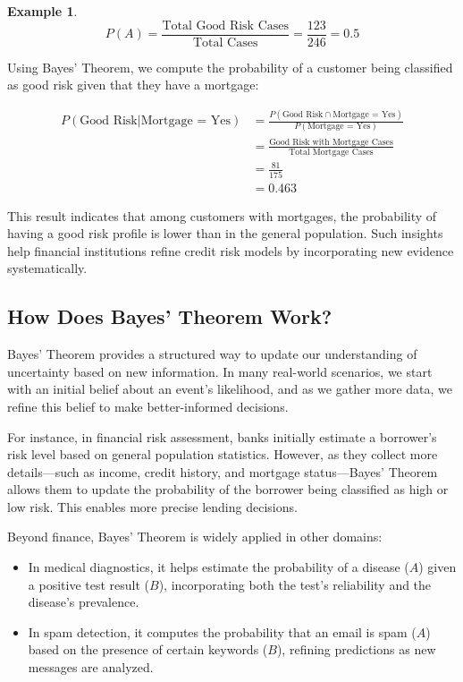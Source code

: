 \documentclass[
  11pt,
]{book}
\providecommand{\tightlist}{%
  \setlength{\itemsep}{0pt}\setlength{\parskip}{0pt}}
\theoremstyle{definition}
\theoremstyle{definition}
\newtheorem{example}{Example}[chapter]
\theoremstyle{definition}
\theoremstyle{definition}
\theoremstyle{remark}
\begin{document}
\begin{example}
\[
P(A) = \frac{\text{Total Good Risk Cases}}{\text{Total Cases}} = \frac{123}{246} = 0.5
\]

Using Bayes' Theorem, we compute the probability of a customer being classified as good risk given that they have a mortgage:

\begin{equation} 
\label{eq1}
\begin{split}
P(\text{Good Risk} | \text{Mortgage = Yes}) & = \frac{P(\text{Good Risk} \cap \text{Mortgage = Yes})}{P(\text{Mortgage = Yes})} \\
 & = \frac{\text{Good Risk with Mortgage Cases}}{\text{Total Mortgage Cases}} \\
 & = \frac{81}{175} \\
 & = 0.463
\end{split}
\end{equation}

This result indicates that among customers with mortgages, the probability of having a good risk profile is lower than in the general population. Such insights help financial institutions refine credit risk models by incorporating new evidence systematically.
\end{example}

\subsection*{How Does Bayes' Theorem Work?}\label{how-does-bayes-theorem-work}


Bayes' Theorem provides a structured way to update our understanding of uncertainty based on new information. In many real-world scenarios, we start with an initial belief about an event's likelihood, and as we gather more data, we refine this belief to make better-informed decisions.

For instance, in financial risk assessment, banks initially estimate a borrower's risk level based on general population statistics. However, as they collect more details---such as income, credit history, and mortgage status---Bayes' Theorem allows them to update the probability of the borrower being classified as high or low risk. This enables more precise lending decisions.

Beyond finance, Bayes' Theorem is widely applied in other domains:

\begin{itemize}
\tightlist
\item
  In medical diagnostics, it helps estimate the probability of a disease (\(A\)) given a positive test result (\(B\)), incorporating both the test's reliability and the disease's prevalence.\\
\item
  In spam detection, it computes the probability that an email is spam (\(A\)) based on the presence of certain keywords (\(B\)), refining predictions as new messages are analyzed.
\end{itemize}
\end{document}
